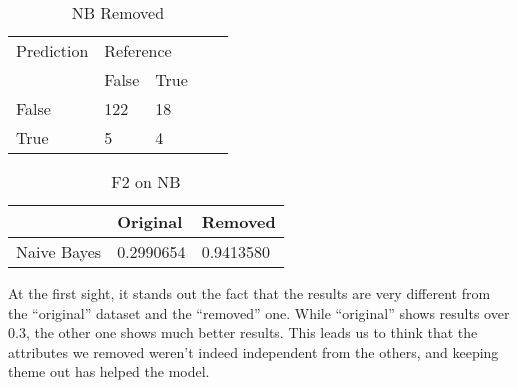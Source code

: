 \begin{table}[!htbp]
\centering
\caption{NB Removed}
\vspace{0.1cm}
\label{nb-remov}
\begin{tabular}{|l|ll|ll}
\cline{1-3}
Prediction & \multicolumn{2}{l|}{Reference} &  &  \\
           & False          & True          &  &  \\ \cline{2-3}
False      & 122              & 18             &  &  \\
True       & 5              & 4             &  &  \\ \cline{1-3}
\end{tabular}
\end{table}

\begin{table}[!htbp]
\centering
\caption{F2 on NB}
\vspace{0.1cm}
\label{nb-f2}
\begin{tabular}{|l|l|l|}
\hline
      & Original & Removed \\ \hline
Naive Bayes & 0.2990654  & 0.9413580       \\ \hline
\end{tabular}
\end{table}


At the first sight, it stands out the fact that the results are very different from the ``original'' dataset and the ``removed'' one. While ``original'' shows results over $0.3$, the other one shows much better results. This leads us to think that the attributes we removed weren't indeed independent from the others, and keeping theme out has helped the model.


